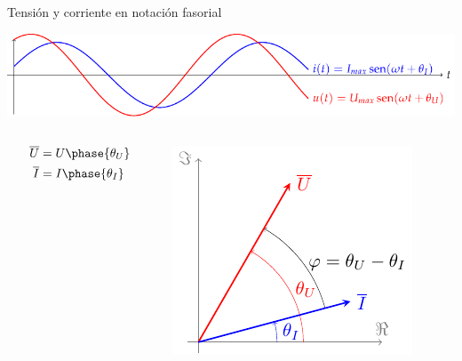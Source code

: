 \documentclass[aspectratio=169, usenames,svgnames,dvipsnames]{beamer}
\begin{document}
\begin{frame}[label={sec:org311110d}]{Tensión y corriente en notación fasorial}
\begin{center}
\includegraphics[width=.9\linewidth]{../figs/ondasTensionCorriente.pdf}
\end{center}

\begin{columns}
\begin{column}{0.5\columnwidth}
\begin{align*}
  \overline{U} &= U\phase{\theta_U}\\
  \overline{I} &= I\phase{\theta_I}
\end{align*}
\end{column}

\begin{column}{0.5\columnwidth}
\begin{center}
\includegraphics[height=0.5\textheight]{../figs/fasorTensionCorriente.pdf}
\end{center}
\end{column}
\end{columns}
\end{frame}
\end{document}
